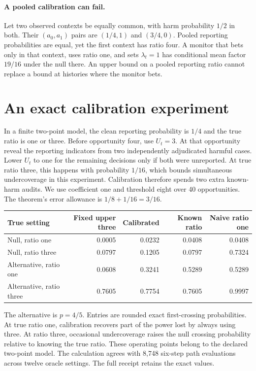 \documentclass[11pt]{article}
\begin{document}
\paragraph{A pooled calibration can fail.}
Let two observed contexts be equally common, with harm
probability $1/2$ in both. Their $(a_0,a_1)$ pairs are
$(1/4,1)$ and $(3/4,0)$. Pooled reporting probabilities are
equal, yet the first context has ratio four. A monitor that
bets only in that context, uses ratio one, and sets
$\lambda_t=1$ has conditional mean factor $19/16$ under
the null there. An upper bound on a pooled reporting ratio
cannot replace a bound at histories where the monitor bets.

\section{An exact calibration experiment}
In a finite two-point model, the clean reporting probability
is $1/4$ and the true ratio is one or three. Before opportunity
four, use $U_t=3$. At that opportunity reveal the reporting
indicators from two independently adjudicated harmful cases.
Lower $U_t$ to one for the remaining decisions only if both
were unreported. At true ratio three, this happens with
probability $1/16$, which bounds simultaneous undercoverage
in this experiment. Calibration therefore spends two extra
known-harm audits. We use coefficient one and threshold eight
over 40 opportunities. The theorem's error allowance is
$1/8+1/16=3/16$.

\begin{center}
\begin{tabular}{lrrrr}
\toprule
True setting & Fixed upper three & Calibrated & Known ratio & Naive ratio one\\
\midrule
Null, ratio one & 0.0005 & 0.0232 & 0.0408 & 0.0408\\
Null, ratio three & 0.0797 & 0.1205 & 0.0797 & 0.7324\\
Alternative, ratio one & 0.0608 & 0.3241 & 0.5289 & 0.5289\\
Alternative, ratio three & 0.7605 & 0.7754 & 0.7605 & 0.9997\\
\bottomrule
\end{tabular}
\end{center}
The alternative is $p=4/5$. Entries are rounded exact
first-crossing probabilities. At true ratio one, calibration
recovers part of the power lost by always using three. At
ratio three, occasional undercoverage raises the null crossing
probability relative to knowing the true ratio. These operating
points belong to the declared two-point model. The calculation
agrees with 8,748 six-step path evaluations across twelve
oracle settings. The full receipt retains the exact values.
\end{document}
